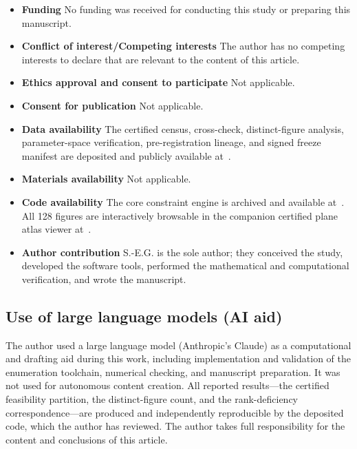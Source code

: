 \documentclass[pdflatex,sn-mathphys-num]{sn-jnl}
\begin{document}
\begin{itemize}
\item \textbf{Funding} 
No funding was received for conducting this study or preparing this manuscript.

\item \textbf{Conflict of interest/Competing interests} 
The author has no competing interests to declare that are relevant to the content of this article.

\item \textbf{Ethics approval and consent to participate} 
Not applicable.

\item \textbf{Consent for publication} 
Not applicable.

\item \textbf{Data availability} 
The certified census, cross-check, distinct-figure analysis, parameter-space verification, pre-registration lineage, and signed freeze manifest are deposited and publicly available at~\cite{Dataset}.

\item \textbf{Materials availability} 
Not applicable.

\item \textbf{Code availability} 
The core constraint engine is archived and available at~\cite{Engine}. All 128 figures are interactively browsable in the companion certified plane atlas viewer at~\cite{Viewer}.

\item \textbf{Author contribution} 
S.-E.G. is the sole author; they conceived the study, developed the software tools, performed the mathematical and computational verification, and wrote the manuscript.
\end{itemize}

\subsection*{Use of large language models (AI aid)}
The author used a large language model (Anthropic's Claude) as a computational and drafting aid during this work, including implementation and validation of the enumeration toolchain, numerical checking, and manuscript preparation. It was not used for autonomous content creation. All reported results---the certified feasibility partition, the distinct-figure count, and the rank-deficiency correspondence---are produced and independently reproducible by the deposited code, which the author has reviewed. The author takes full responsibility for the content and conclusions of this article.
\end{document}
